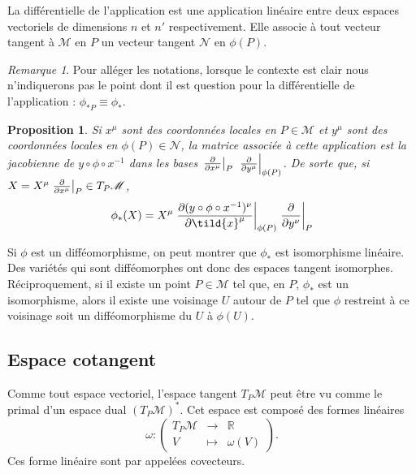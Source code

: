 \documentclass[a4paper,11pt]{report}
\theoremstyle{definition}
\theoremstyle{plain}
\newtheorem{prop}[thm]{Proposition}
\theoremstyle{definition}
\theoremstyle{remark}
\newtheorem{rmk}{Remarque}[chapter]
\newcommand{\M}{\mathscr{M}}
\newcommand{\N}{\mathscr{N}}
\begin{document}
                La différentielle de l'application est une application linéaire entre deux espaces vectoriels de dimensions $n$ et $n'$ respectivement. Elle associe à tout vecteur tangent à $\M$ en $P$ un vecteur tangent $\N$ en $\phi(P)$.
                
                \begin{rmk}
                    Pour alléger les notations, lorsque le contexte est clair nous n'indiquerons pas le point dont il est question pour la différentielle de l'application : $\phi_{*P}\equiv\phi_*$.
                \end{rmk}
                
                \begin{prop}
                    Si $x^\mu$ sont des coordonnées locales en $P\in\M$ et $y^\mu$ sont des coordonnées locales en $\phi(P)\in\N$, la matrice associée à cette application est la jacobienne de $y\circ\phi\circ x^{-1}$ dans les bases $\eval{\pdv{}{x^\mu}}_{P}$ $\eval{\pdv{}{y^\mu}}_{\phi(P)}$. De sorte que, si $X = X^\mu\eval{\pdv{}{x^\mu}}_{P}\in T_P\M$, 
                    \begin{equation}
                        \phi_*(X) = X^\mu\eval{\pdv{(y\circ\phi\circ x^{-1})^\nu}{\tild{x}^\mu}}_{\phi(P)}\eval{\pdv{}{y^\nu}}_{P}
                    \end{equation}
                \end{prop}
                
                Si $\phi$ est un difféomorphisme, on peut montrer que $\phi_*$ est isomorphisme linéaire. Des variétés qui sont difféomorphes ont donc des espaces tangent isomorphes. Réciproquement, si il existe un point $P\in\M$ tel que, en $P$, $\phi_*$ est un isomorphisme, alors il existe une voisinage $U$ autour de $P$ tel que $\phi$ restreint à ce voisinage soit un difféomorphisme du $U$ à $\phi(U)$.
            
            \subsection{Espace cotangent}
            
                Comme tout espace vectoriel, l'espace tangent $T_P\M$ peut être vu comme le primal d'un espace dual $(T_P\M)^*$. Cet espace est composé des formes linéaires
                \begin{equation}
                    \omega:\left(
                \begin{array}{ccc}
                    T_P\M & \longrightarrow & \mathbb{R} \\
                    V & \longmapsto & \omega(V)
                \end{array}
                \right).
                \end{equation}
                Ces forme linéaire sont par appelées covecteurs.
                
\end{document}
